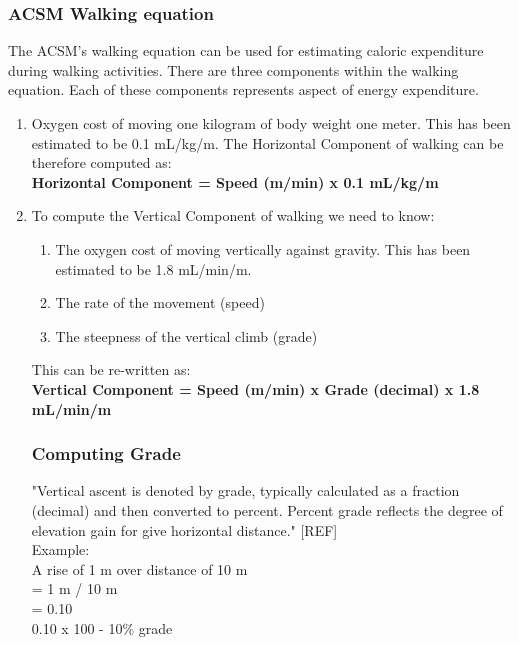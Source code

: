 \documentclass[12pt, a4paper]{report}   %
\begin{document}
\begin{enumerate}
\clearpage
\subsubsection{ACSM Walking equation}
The ACSM's walking equation can be used for estimating caloric expenditure during walking activities. There are three components within the walking equation. Each of these components represents aspect of energy expenditure.

\begin{enumerate}
	\item Oxygen cost of moving one kilogram of body weight one meter. This has been estimated to be 0.1 mL/kg/m. The Horizontal Component of walking can be therefore computed as:\\

\textbf{Horizontal Component = Speed (m/min) x 0.1 mL/kg/m}\\
	
	\item To compute the Vertical Component of walking we need to know:
	\begin{enumerate}
		\item The oxygen cost of moving vertically against gravity. This has been estimated to be 1.8 mL/min/m.
		\item The rate of the movement (speed)
		\item The steepness of the vertical climb (grade)\\
	\end{enumerate}


This can be re-written as:\\

\textbf{Vertical Component = Speed (m/min) x Grade (decimal) x 1.8 mL/min/m}

\subsubsection{Computing Grade}
"Vertical ascent is denoted by grade, typically calculated as a fraction (decimal) and then converted to percent. Percent grade reflects the degree of elevation gain for give horizontal distance." [REF]\\

Example:\\

A rise of 1 m over distance of 10 m \\ =
1 m / 10 m \\ = 0.10 \\
0.10 x 100 - 10\% grade\\



\end{enumerate}
\end{enumerate}
\end{document}
